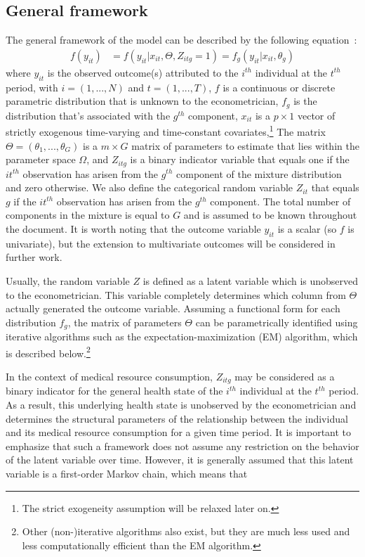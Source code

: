 \documentclass[11pt,letter]{article}
\begin{document}
\subsection{General framework}
The general framework of the model can be described by the following equation~:
\begin{align}\label{eqn:1}
f(y_{it}) &= f(y_{it}|x_{it},\Theta,Z_{itg}=1) = f_g(y_{it}|x_{it},\theta_g)
\end{align}
where $y_{it}$ is the observed outcome(s) attributed to the $i^{th}$ individual at the $t^{th}$ period, with $i=(1,...,N)$ and $t=(1,...,T)$, $f$ is a continuous or discrete parametric distribution that is unknown to the econometrician, $f_g$ is the distribution that's associated with the $g^{th}$ component, $x_{it}$ is a $p \times 1$ vector of strictly exogenous time-varying and time-constant covariates,\footnote{The strict exogeneity assumption will be relaxed later on.} The matrix $\Theta = (\theta_1,...,\theta_G)$ is a $m \times G$ matrix of parameters to estimate that lies within the parameter space $\Omega$, and $Z_{itg}$ is a binary indicator variable that equals one if the $it^{th}$ observation has arisen from the $g^{th}$ component of the mixture distribution and zero otherwise. We also define the categorical random variable $Z_{it}$ that equals $g$ if the $it^{th}$ observation has arisen from the $g^{th}$ component. The total number of components in the mixture is equal to $G$ and is assumed to be known throughout the document. It is worth noting that the outcome variable $y_{it}$ is a scalar (so $f$ is univariate), but the extension to multivariate outcomes will be considered in further work.
\par
Usually, the random variable $Z$ is defined as a latent variable which is unobserved to the econometrician. This variable completely determines which column from $\Theta$ actually generated the outcome variable. Assuming a functional form for each distribution $f_g$, the matrix of parameters $\Theta$ can be parametrically identified using iterative algorithms such as the expectation-maximization (EM) algorithm, which is described below.\footnote{Other (non-)iterative algorithms also exist, but they are much less used and less computationally efficient than the EM algorithm.}
\par
In the context of medical resource consumption, $Z_{itg}$ may be considered as a binary indicator for the general health state of the $i^{th}$ individual at the $t^{th}$ period. As a result, this underlying health state is unobserved by the econometrician and determines the structural parameters of the relationship between the individual and its medical resource consumption for a given time period. It is important to emphasize that such a framework does not assume any restriction on the behavior of the latent variable over time. However, it is generally assumed that this latent variable is a first-order Markov chain, which means that
\end{document}
